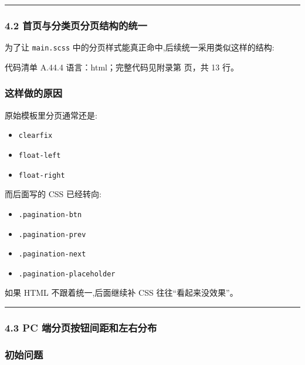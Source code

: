 \documentclass[lang=cn,scheme=chinese,color=blue,device=normal,toc=onecol,math=cm]{elegantbook}
\begin{document}
\medskip\hrule\medskip


\subsubsection{4.2 首页与分类页分页结构的统一}


为了让 \texttt{main.scss} 中的分页样式能真正命中,后续统一采用类似这样的结构:\par


\begin{codeindexbox}{代码清单 A.44.4}
语言：html；完整代码见附录第 \pageref{code:44:4} 页，共 13 行。
\end{codeindexbox}


\subsubsection{这样做的原因}


原始模板里分页通常还是:\par


\begin{itemize}
\item \texttt{clearfix}
\item \texttt{float-left}
\item \texttt{float-right}
\end{itemize}


而后面写的 CSS 已经转向:\par


\begin{itemize}
\item \texttt{.pagination-btn}
\item \texttt{.pagination-prev}
\item \texttt{.pagination-next}
\item \texttt{.pagination-placeholder}
\end{itemize}


如果 HTML 不跟着统一,后面继续补 CSS 往往“看起来没效果”。\par


\medskip\hrule\medskip


\subsubsection{4.3 PC 端分页按钮间距和左右分布}


\subsubsection{初始问题}
\end{document}
